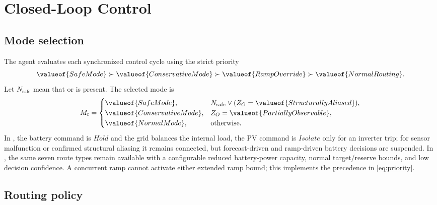 \section{Closed-Loop Control}

\subsection{Mode selection}

The agent evaluates each synchronized control cycle using the strict priority
\begin{equation}
\label{eq:priority}
\valueof{SafeMode}\succ
\valueof{ConservativeMode}\succ
\valueof{RampOverride}\succ
\valueof{NormalRouting}.
\end{equation}
Let $N_{\mathrm{safe}}$ mean that  or  is present. The selected mode is
\begin{equation}
\label{eq:mode-selection}
M_t=
\begin{cases}
\valueof{SafeMode}, & N_{\mathrm{safe}}\vee
(Z_O=\valueof{StructurallyAliased}),\\
\valueof{ConservativeMode}, & Z_O=\valueof{PartiallyObservable},\\
\valueof{NormalMode}, & \text{otherwise}.
\end{cases}
\end{equation}
In , the battery command is $Hold$ and the grid balances the internal load, the PV command is $Isolate$ only for an inverter trip; for sensor malfunction or confirmed structural aliasing it remains connected, but forecast-driven and ramp-driven battery decisions are suspended. In , the same seven route types remain available with a configurable reduced battery-power capacity, normal target/reserve bounds, and low decision confidence. A concurrent ramp cannot activate either extended ramp bound; this implements the precedence in \autoref{eq:priority}.

\subsection{Routing policy}

